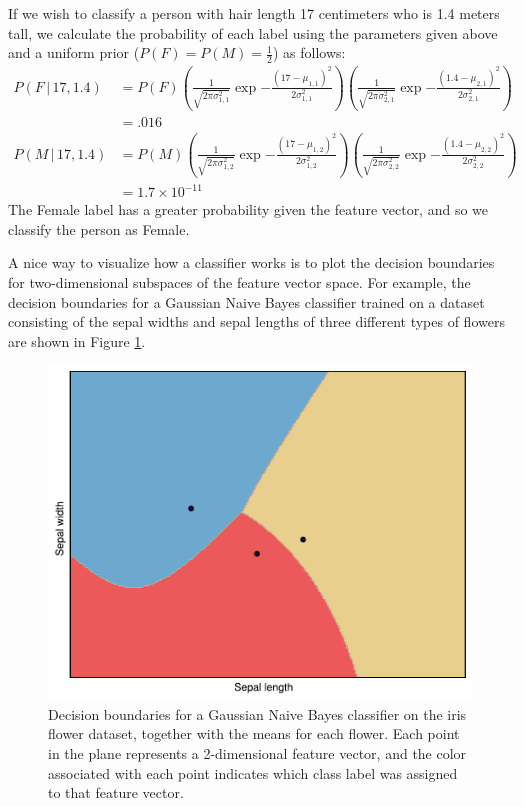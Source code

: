 If we wish to classify a person with hair length 17 centimeters who is 1.4 meters tall, we calculate the probability of each label using the parameters given above and a uniform prior ($P(F) = P(M) = \frac{1}{2}$) as follows:
\begin{align*}
P(F\,|\,17,1.4) &= P(F)\left(\frac{1}{\sqrt{2\pi\sigma_{1,1}^2}}\exp{-\frac{(17-\mu_{1,1})^2}{2\sigma^2_{1,1}}}\right)
\left(\frac{1}{\sqrt{2\pi\sigma_{2,1}^2}}\exp{-\frac{(1.4-\mu_{2,1})^2}{2\sigma^2_{2,1}}}\right)\\
&= .016\\
P(M\,|\,17,1.4) &= P(M)\left(\frac{1}{\sqrt{2\pi\sigma_{1,2}^2}}\exp{-\frac{(17-\mu_{1,2})^2}{2\sigma^2_{1,2}}}\right)
\left(\frac{1}{\sqrt{2\pi\sigma_{2,2}^2}}\exp{-\frac{(1.4-\mu_{2,2})^2}{2\sigma^2_{2,2}}}\right)\\
&= 1.7\times 10^{-11}
\end{align*}
The Female label has a greater probability given the feature vector, and so we classify the person as Female.

A nice way to visualize how a classifier works is to plot the decision boundaries for two-dimensional subspaces of the
feature vector space.
For example, the decision boundaries for a Gaussian Naive Bayes classifier trained on a dataset consisting of the
sepal widths and sepal lengths of three different types of flowers are shown in Figure \ref{fig:decision_boundary}.

\begin{figure}
	\centering
	\includegraphics[width=.90\textwidth]{decision_boundary}
	\caption{Decision boundaries for a Gaussian Naive Bayes classifier on the iris flower dataset, together with the means
for each flower. Each point in the plane represents a 2-dimensional feature vector, and the color associated with each point indicates which class label was assigned to that feature vector.}
	\label{fig:decision_boundary}
\end{figure}

